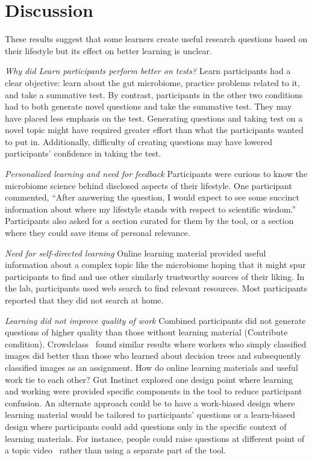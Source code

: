 \section{Discussion}
These results suggest that some learners create useful research questions based on their lifestyle but its effect on better learning is unclear.

\textit{Why did Learn participants perform better on tests?}
Learn participants had a clear objective: learn about the gut microbiome, practice problems related to it, and take a summative test. By contrast, participants in the other two conditions had to both generate novel questions and take the summative test. They may have placed less emphasis on the test. Generating questions and taking test on a novel topic might have required greater effort than what the participants wanted to put in. Additionally, difficulty of creating questions may have lowered participants’ confidence in taking the test. 

\textit{Personalized learning and need for feedback}
Participants were curious to know the microbiome science behind disclosed aspects of their lifestyle. One participant commented, “After answering the question, I would expect to see some succinct information about where my lifestyle stands with respect to scientific wisdom.” Participants also asked for a section curated for them by the tool, or a section where they could save items of personal relevance.
 
\textit{Need for self-directed learning}
Online learning material provided useful information about a complex topic like the microbiome hoping that it might spur participants to find and use other similarly trustworthy sources of their liking. In the lab, participants used web search to find relevant resources. Most participants reported that they did not search at home. 

\textit{Learning did not improve quality of work}
Combined participants did not generate questions of higher quality than those without learning material (Contribute condition). Crowdclass~\cite{Lee2016} found similar results where workers who simply classified images did better than those who learned about decision trees and subsequently classified images as an assignment. How do online learning materials and useful work tie to each other? Gut Instinct explored one design point where learning and working were provided specific components in the tool to reduce participant confusion. An alternate approach could be to have a work-biased design where learning material would be tailored to participants’ questions or a learn-biased design where participants could add questions only in the specific context of learning materials. For instance, people could raise questions at different point of a topic video~\cite{Lee2015b} rather than using a separate part of the tool.
 
